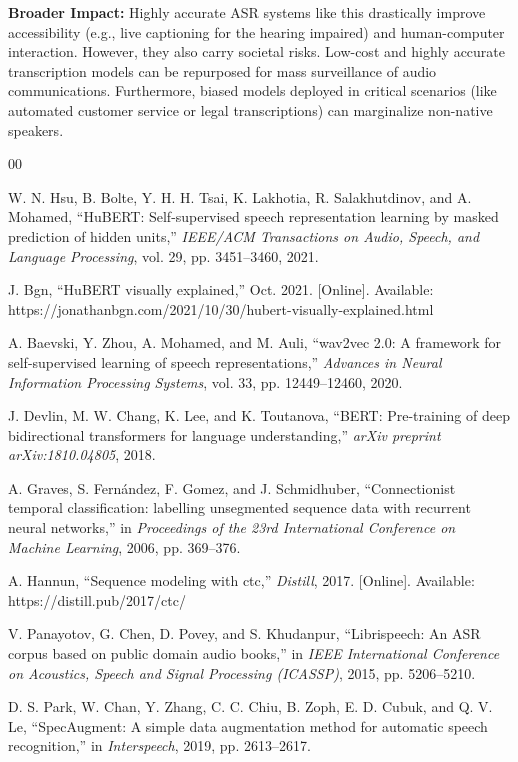 \documentclass[conference]{IEEEtran}
\begin{document}
\textbf{Broader Impact:} Highly accurate ASR systems like this drastically improve accessibility (e.g., live captioning for the hearing impaired) and human-computer interaction.
However, they also carry societal risks. Low-cost and highly accurate transcription models can be repurposed for mass surveillance of audio communications.
Furthermore, biased models deployed in critical scenarios (like automated customer service or legal transcriptions) can marginalize non-native speakers.

\begin{thebibliography}{00}

W. N. Hsu, B. Bolte, Y. H. H. Tsai, K. Lakhotia, R. Salakhutdinov, and A. Mohamed, ``HuBERT: Self-supervised speech representation learning by masked prediction of hidden units,'' \textit{IEEE/ACM Transactions on Audio, Speech, and Language Processing}, vol. 29, pp. 3451--3460, 2021.

J. Bgn, ``HuBERT visually explained,'' Oct. 2021. [Online]. Available: https://jonathanbgn.com/2021/10/30/hubert-visually-explained.html

A. Baevski, Y. Zhou, A. Mohamed, and M. Auli, ``wav2vec 2.0: A framework for self-supervised learning of speech representations,'' \textit{Advances in Neural Information Processing Systems}, vol. 33, pp. 12449--12460, 2020.

J. Devlin, M. W. Chang, K. Lee, and K. Toutanova, ``BERT: Pre-training of deep bidirectional transformers for language understanding,'' \textit{arXiv preprint arXiv:1810.04805}, 2018.

A. Graves, S. Fern\'{a}ndez, F. Gomez, and J. Schmidhuber, ``Connectionist temporal classification: labelling unsegmented sequence data with recurrent neural networks,'' in \textit{Proceedings of the 23rd International Conference on Machine Learning}, 2006, pp. 369--376.

A. Hannun, ``Sequence modeling with ctc,'' \textit{Distill}, 2017. [Online]. Available: https://distill.pub/2017/ctc/

V. Panayotov, G. Chen, D. Povey, and S. Khudanpur, ``Librispeech: An ASR corpus based on public domain audio books,'' in \textit{IEEE International Conference on Acoustics, Speech and Signal Processing (ICASSP)}, 2015, pp. 5206--5210.

D. S. Park, W. Chan, Y. Zhang, C. C. Chiu, B. Zoph, E. D. Cubuk, and Q. V. Le, ``SpecAugment: A simple data augmentation method for automatic speech recognition,'' in \textit{Interspeech}, 2019, pp. 2613--2617.

\end{thebibliography}
\end{document}

